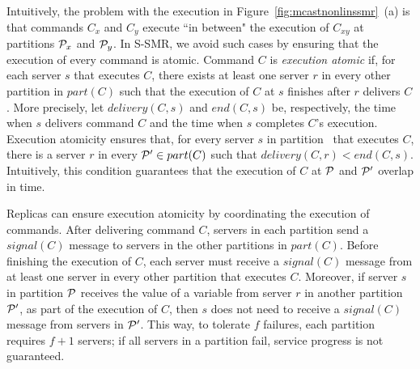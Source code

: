 Intuitively, the problem with the execution in Figure~\ref{fig:mcastnonlinssmr}~(a) is that commands $C_x$ and $C_y$ execute ``in between" the execution of $C_{xy}$ at partitions $\mathcal{P}_x$ and $\mathcal{P}_y$.
In S-SMR, we avoid such cases by ensuring that the execution of every command is atomic.
%
Command $C$ is \emph{execution atomic} if, for each server $s$ that executes $C$, there exists at least one server $r$ in every other partition in $part(C)$ such that the execution of $C$ at $s$ finishes after $r$ delivers $C$.
%
More precisely, let $delivery(C,s)$ and $end(C,s)$ be, respectively, the time when $s$ delivers command $C$ and the time when $s$ completes $C$'s execution.
Execution atomicity ensures that, for every server $s$ in partition \pp\ that executes $C$, there is a server $r$ in every $\mathcal{P}' \in part(C)$ such that $delivery(C,r) < end(C,s)$.
Intuitively, this condition guarantees that the execution of $C$ at $\mathcal{P}$ and $\mathcal{P}'$ overlap in time.


Replicas can ensure execution atomicity by coordinating the execution of commands.
After delivering command $C$, servers in each partition send a $signal(C)$ message to servers in the other partitions in $part(C)$.
Before finishing the execution of $C$, each server must receive a $signal(C)$ message from at least one server in every other partition that executes $C$. 
Moreover, if server $s$ in partition $\mathcal{P}$ receives the value of a variable from server $r$ in another partition $\mathcal{P}'$, as part of the execution of $C$, then $s$ does not need to receive a $signal(C)$ message from servers in $\mathcal{P}'$. This way, to tolerate $f$ failures, each partition requires $f+1$ servers; if all servers in a partition fail, service progress is not guaranteed.

